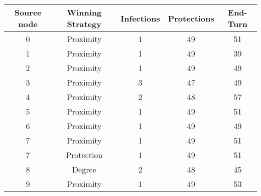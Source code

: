 \documentclass[results.tex]{subfiles}
\begin{document}
    \begin{center}
        \begin{tabular}{| c || c | c | c | c |}
            \hline
            {\bfseries Source node} & {\bfseries Winning Strategy} & {\bfseries Infections} & {\bfseries Protections}
            & {\bfseries End-Turn}
            \\  %
            \hline\hline
            0                       & Proximity                    & 1                      & 49                      & 51                   \\
            \hline
            1                       & Proximity                    & 1                      & 49                      & 39                   \\
            \hline
            2                       & Proximity                    & 1                      & 49                      & 49                   \\
            \hline
            3                       & Proximity                    & 3                      & 47                      & 49                   \\
            \hline
            4                       & Proximity                    & 2                      & 48                      & 57                   \\
            \hline
            5                       & Proximity                    & 1                      & 49                      & 51                   \\
            \hline
            6                       & Proximity                    & 1                      & 49                      & 49                   \\
            \hline
            7                       & Proximity                    & 1                      & 49                      & 51                   \\
            \hline
            7                       & Protection                   & 1                      & 49                      & 51                   \\
            \hline
            8                       & Degree                       & 2                      & 48                      & 45                   \\
            \hline
            9                       & Proximity                    & 1                      & 49                      & 53                   \\

\end{tabular}
\end{center}
\end{document}
